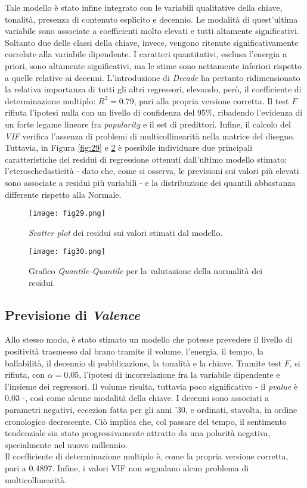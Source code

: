 \documentclass[fleqn,10pt]{SelfArx} %
\begin{document}
Tale modello è stato infine integrato con le variabili qualitative della chiave, tonalità, presenza di contenuto esplicito e decennio. Le modalità di quest'ultima variabile sono associate a coefficienti molto elevati e tutti altamente significativi. Soltanto due delle classi della chiave, invece, vengono ritenute significativamente correlate alla variabile dipendente. I caratteri quantitativi, esclusa l'energia a priori, sono altamente significativi, ma le stime sono nettamente inferiori rispetto a quelle relative ai decenni. L'introduzione di \textit{Decade} ha pertanto ridimensionato la relativa importanza di tutti gli altri regressori, elevando, però, il coefficiente di determinazione multiplo: $R^2=0.79$, pari alla propria versione corretta. Il test $F$ rifiuta l'ipotesi nulla con un livello di confidenza del 95\%, ribadendo l'evidenza di un forte legame lineare fra \textit{popularity} e il set di predittori. Infine, il calcolo del \textit{VIF} verifica l'assenza di problemi di multicollinearità nella matrice del disegno.\\
Tuttavia, in Figura \ref{fig:29} e \ref{fig:fig30} è possibile individuare due principali caratteristiche dei residui di regressione ottenuti dall'ultimo modello stimato: l'eteroschedasticità - dato che, come si osserva, le previsioni sui valori più elevati sono associate a residui più variabili - e la distribuzione dei quantili abbastanza differente rispetto alla Normale.
\begin{figure}[h]
    \centering
    \texttt{[image: fig29.png]}
    \label{fig:fig29}
    \caption{\textit{Scatter plot} dei residui sui valori stimati dal modello.}
\end{figure}
\begin{figure}[h]
    \centering
    \texttt{[image: fig30.png]}
    \label{fig:fig30}
    \caption{Grafico \textit{Quantile-Quantile} per la valutazione della normalità dei residui.}
\end{figure}

\subsection{Previsione di \textit{Valence}}
Allo stesso modo, è stato stimato un modello che potesse prevedere il livello di positività trasmesso dal brano tramite il volume, l'energia, il tempo, la ballabilità, il decennio di pubblicazione, la tonalità e la chiave. Tramite test $F$, si rifiuta, con $\alpha=0.05$, l'ipotesi di incorrelazione fra la variabile dipendente e l’insieme dei regressori. Il volume risulta, tuttavia poco significativo - il \textit{pvalue} è 0.03 -, così come alcune modalità della chiave. I decenni sono associati a parametri negativi, eccezion fatta per gli anni '30, e ordinati, stavolta, in ordine cronologico decrescente. Ciò implica che, col passare del tempo, il sentimento tendenziale sia stato progressivamente attratto da una polarità negativa, specialmente nel nuovo millennio.\\
Il coefficiente di determinazione multiplo è, come la propria versione corretta, pari a 0.4897. Infine, i valori VIF non segnalano alcun problema di multicollinearità.
\end{document}
